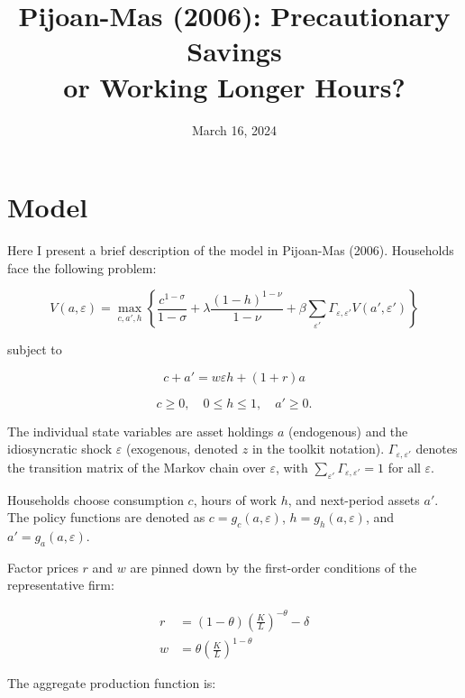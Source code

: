 \documentclass[12pt]{article}
\title{Pijoan-Mas (2006): Precautionary Savings\\or Working Longer Hours?}
\date{March 16, 2024}
\begin{document}
	
	\maketitle
	
	\section*{Model}
	
	Here I present a brief description of the model in Pijoan-Mas (2006). Households face the following problem:
	
	\begin{equation*}
		V(a, \varepsilon) = \max_{c, a', h} \left\{ \frac{c^{1 - \sigma}}{1 - \sigma} + \lambda \frac{(1 - h)^{1 - \nu}}{1 - \nu} + \beta \sum_{\varepsilon'} \Gamma_{\varepsilon, \varepsilon'} V(a', \varepsilon') \right\}
	\end{equation*}
	
	subject to
	
	\begin{equation*}
		c + a' = w \varepsilon h + (1 + r)a
	\end{equation*}
	
	\begin{equation*}
		c \geq 0, \quad 0 \leq h \leq 1, \quad a' \geq 0.
	\end{equation*}
	
	The individual state variables are asset holdings $a$ (endogenous) and the idiosyncratic shock $\varepsilon$ (exogenous, denoted $z$ in the toolkit notation). $\Gamma_{\varepsilon, \varepsilon'}$ denotes the transition matrix of the Markov chain over $\varepsilon$, with $\sum_{\varepsilon'} \Gamma_{\varepsilon, \varepsilon'} = 1$ for all $\varepsilon$.
	
	Households choose consumption $c$, hours of work $h$, and next-period assets $a'$. The policy functions are denoted as $c = g_c(a, \varepsilon)$, $h = g_h(a, \varepsilon)$, and $a' = g_a(a, \varepsilon)$.
	
	Factor prices $r$ and $w$ are pinned down by the first-order conditions of the representative firm:
	
	\begin{align*}
		r &= (1 - \theta) \left(\frac{K}{L}\right)^{-\theta} - \delta \\
		w &= \theta \left(\frac{K}{L}\right)^{1 - \theta}
	\end{align*}
	
	The aggregate production function is:
	
\end{document}
